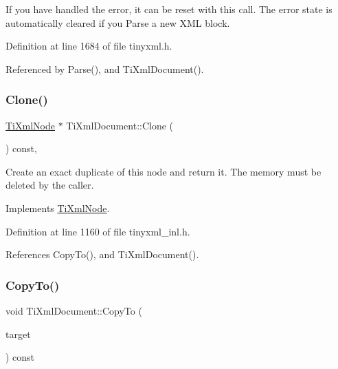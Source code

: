 If you have handled the error, it can be reset with this call. The error state is automatically cleared if you Parse a new X\+ML block. 

Definition at line 1684 of file tinyxml.\+h.



Referenced by Parse(), and Ti\+Xml\+Document().

\hypertarget{class_ti_xml_document_a46a4dda6c56eb106d46d4046ae1e5353}{}\label{class_ti_xml_document_a46a4dda6c56eb106d46d4046ae1e5353} 
\subsubsection{\texorpdfstring{Clone()}{Clone()}}
{\footnotesize\ttfamily \hyperlink{class_ti_xml_node}{Ti\+Xml\+Node} $\ast$ Ti\+Xml\+Document\+::\+Clone (\begin{DoxyParamCaption}{ }\end{DoxyParamCaption}) const\hspace{0.3cm}{\ttfamily [protected]}, {\ttfamily [virtual]}}

Create an exact duplicate of this node and return it. The memory must be deleted by the caller. 

Implements \hyperlink{class_ti_xml_node_a4508cc3a2d7a98e96a54cc09c37a78a4}{Ti\+Xml\+Node}.



Definition at line 1160 of file tinyxml\+\_\+inl.\+h.



References Copy\+To(), and Ti\+Xml\+Document().

\hypertarget{class_ti_xml_document_aa57c3b2209e540644ca3eb591f6da227}{}\label{class_ti_xml_document_aa57c3b2209e540644ca3eb591f6da227} 
\subsubsection{\texorpdfstring{Copy\+To()}{CopyTo()}}
{\footnotesize\ttfamily void Ti\+Xml\+Document\+::\+Copy\+To (\begin{DoxyParamCaption}\item[{\hyperlink{class_ti_xml_document}{Ti\+Xml\+Document} $\ast$}]{target }\end{DoxyParamCaption}) const\hspace{0.3cm}{\ttfamily [private]}}



